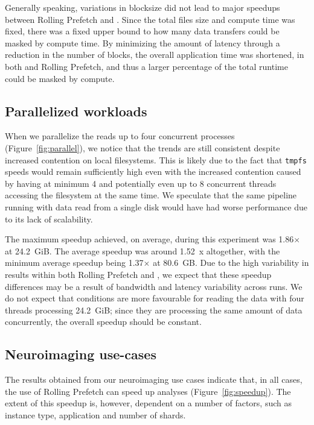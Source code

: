 \documentclass[conference]{IEEEtran}
\begin{document}
Generally speaking, variations in blocksize did not lead to major speedups between Rolling Prefetch and \sfs. Since the
total files size and compute time was fixed, there was a fixed upper bound to how many data transfers could
be masked by compute time. By minimizing the amount of latency through a reduction in the number of blocks, the 
overall application time was shortened, in both \sfs and Rolling Prefetch, and thus a larger percentage of the total 
runtime could be masked by compute.

\subsection{Parallelized workloads}
When we parallelize the reads up to four concurrent processes (Figure~\ref{fig:parallel}), we notice that the trends are still consistent
despite increased contention on local filesystems. This is likely due to the fact that \texttt{tmpfs} speeds
would remain sufficiently high even with the increased contention caused by having at minimum 4 and 
potentially even up to 8 concurrent threads accessing the filesystem at the same time. We speculate that the same 
pipeline running with data read from a single disk would have had worse performance
due to its lack of scalability.

The maximum speedup achieved, on average, during this experiment was 1.86$\times$ at 24.2~GiB. The average speedup
was around 1.52~x altogether, with the minimum average speedup being 1.37$\times$ at 80.6~GB. Due to the high
variability in results within both Rolling Prefetch and \sfs, we expect that these speedup differences may be a
result of bandwidth and latency variability across runs. We do not expect that conditions are more favourable
for reading the data with four threads processing 24.2~GiB; since they are processing the
same amount of data concurrently, the overall speedup should be constant.

\subsection{Neuroimaging use-cases}

The results obtained from our neuroimaging use cases indicate that, in all
cases, the use of Rolling Prefetch can speed up analyses (Figure~\ref{fig:speedup}).
The extent of this speedup is, however, dependent on a number of
factors, such as instance type, application and number of shards.
\end{document}
